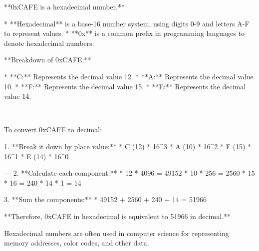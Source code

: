 **0xCAFE is a hexadecimal number.**

* **Hexadecimal** is a base-16 number system, using digits 0-9 and letters A-F to represent values.
* **0x** is a common prefix in programming languages to denote hexadecimal numbers.

**Breakdown of 0xCAFE:**

* **C:** Represents the decimal value 12.
* **A:** Represents the decimal value 10.
* **F:** Represents the decimal value 15.
* **E:** Represents the decimal value 14.

---

To convert 0xCAFE to decimal:

1. **Break it down by place value:**
   * C (12) * 16^3 
   * A (10) * 16^2 
   * F (15) * 16^1 
   * E (14) * 16^0

---
2. **Calculate each component:**
   * 12 * 4096 = 49152
   * 10 * 256 = 2560
   * 15 * 16 = 240
   * 14 * 1 = 14

3. **Sum the components:**
   * 49152 + 2560 + 240 + 14 = 51966

**Therefore, 0xCAFE in hexadecimal is equivalent to 51966 in decimal.**

Hexadecimal numbers are often used in computer science for representing memory addresses, color codes, and other data.
